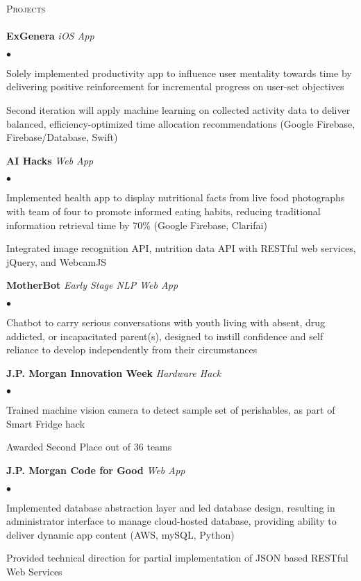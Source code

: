 \documentclass{article}
\newcommand{\click}[2]{\href{http://#1}{\colorlet{temp}{.}\color{blue}{\underline{\color{temp}#2}}\color{temp}}}
\newcommand{\lineunder}{\vspace*{-8pt} \\ \hspace*{-18pt} \hrulefill \\}
\newcommand{\header}[1]{{\hspace*{-15pt}\vspace*{6pt} \textsc{#1}} 
\vspace*{-6pt} \lineunder}
\newenvironment{achievements}{\begin{list}{$\bullet$}{\topsep 0pt \itemsep 
-2pt}}{\vspace*{4pt}\end{list}}
\begin{document}
\header{Projects}

\textbf{ExGenera} \textit{iOS App}
\begin{achievements}
\item Solely implemented productivity app to influence user mentality towards 
time by delivering positive reinforcement for incremental progress on user-set 
objectives \click{docs.google.com/presentation/d/1Ooi15zdYRu3Xi650aCCaRHd5b85O35AJLMXs9L1mX6E/edit?usp=sharing}{(presentation link)}
\item Second iteration will apply machine learning on collected activity data 
to deliver balanced, efficiency-optimized time allocation recommendations 
(Google Firebase, Firebase/Database, Swift)
\end{achievements}

\textbf{AI Hacks} \textit{Web App}
\begin{achievements}
\item Implemented health app to display nutritional facts 
from live food photographs with team of four to promote informed 
eating habits, reducing traditional information retrieval time by 70\% (Google 
Firebase, Clarifai)
\item  Integrated image recognition API, nutrition data API with RESTful web services, jQuery, and WebcamJS
\end{achievements}

\textbf{MotherBot} \textit{Early Stage NLP Web App}
\begin{achievements}
\item Chatbot to carry serious conversations with youth living with absent, drug addicted, or incapacitated parent(s), designed to instill confidence and self reliance to develop independently from their circumstances
\end{achievements}

\textbf{J.P. Morgan Innovation Week} \textit{Hardware Hack}
\begin{achievements}
	\item Trained machine vision camera to detect sample set of perishables, as part of Smart Fridge hack
	\item Awarded Second Place out of 36 teams
\end{achievements}

\textbf{J.P. Morgan Code for Good} \textit{Web App}
\begin{achievements}
	\item Implemented database abstraction layer and led database design, 
resulting in administrator interface to manage cloud-hosted database, providing 
ability to deliver dynamic app content (AWS, mySQL, Python)
	\item Provided technical direction for partial implementation of JSON 
based RESTful Web Services
\end{achievements}
\end{document}
